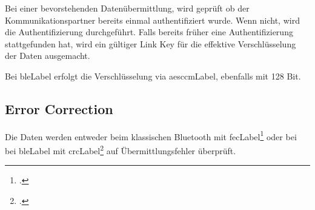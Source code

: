 Bei einer bevorstehenden Datenübermittlung, wird geprüft ob der Kommunikationspartner bereits einmal authentifiziert wurde. Wenn nicht, wird die Authentifizierung durchgeführt.
Falls bereits früher eine Authentifizierung stattgefunden hat, wird ein gültiger Link Key für die effektive Verschlüsselung der Daten ausgemacht.

Bei \gls{bleLabel} erfolgt die Verschlüsselung via \gls{aesccmLabel}, ebenfalls mit 128 Bit.

\subsection{Error Correction}
Die Daten werden entweder beim klassischen Bluetooth mit \gls{fecLabel}\footcite{Forward_error_correction_Wikipedia_2015-04-27} oder bei bei \gls{bleLabel} mit \gls{crcLabel}\footcite{Cyclic_redundancy_check_Wikipedia_2015-04-27} auf Übermittlungsfehler überprüft.
